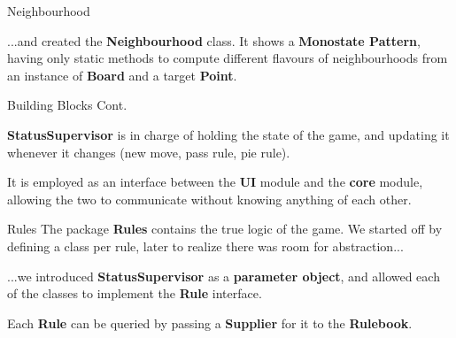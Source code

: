 \documentclass{beamer}
\begin{document}
\begin{frame} {Neighbourhood}

...and created the \textbf{Neighbourhood} class. It shows a \textbf{Monostate Pattern}, having only static methods to compute different flavours of neighbourhoods from an instance of \textbf{Board} and a target \textbf{Point}.

\end{frame}


\begin{frame} {Building Blocks Cont.}

\textbf{StatusSupervisor} is in charge of holding the state of the game, and updating it whenever it changes (new move, pass rule, pie rule).

\vspace{1em}

It is employed as an interface between the \textbf{UI} module and the \textbf{core} module, allowing the two to communicate without knowing anything of each other.

\end{frame}

\begin{frame} {Rules}
The package \textbf{Rules} contains the true logic of the game. We started off by defining a class per rule, later to realize there was room for abstraction...

\vspace{1em}

...we introduced \textbf{StatusSupervisor} as a \textbf{parameter object}, and allowed each of the classes to implement the \textbf{Rule} interface.

\vspace{1em}

Each \textbf{Rule} can be queried by passing a \textbf{Supplier} for it to the \textbf{Rulebook}.

\end{frame}
\end{document}
